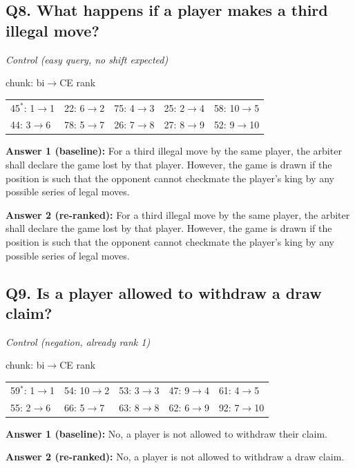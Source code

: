 \subsection*{Q8. What happens if a player makes a third illegal move?}
\emph{Control (easy query, no shift expected)}\par
{\small chunk: bi$\to$CE rank\par\smallskip \begin{tabular}{@{}lllll@{}}
45$^*$: 1$\to$1 & 22: 6$\to$2 & 75: 4$\to$3 & 25: 2$\to$4 & 58: 10$\to$5 \\
44: 3$\to$6 & 78: 5$\to$7 & 26: 7$\to$8 & 27: 8$\to$9 & 52: 9$\to$10
\end{tabular}}\par\smallskip
\textbf{Answer 1 (baseline):} For a third illegal move by the same player, the arbiter shall declare the game lost by that player. However, the game is drawn if the position is such that the opponent cannot checkmate the player’s king by any possible series of legal moves.\par
\textbf{Answer 2 (re-ranked):} For a third illegal move by the same player, the arbiter shall declare the game lost by that player. However, the game is drawn if the position is such that the opponent cannot checkmate the player’s king by any possible series of legal moves.\par

\subsection*{Q9. Is a player allowed to withdraw a draw claim?}
\emph{Control (negation, already rank 1)}\par
{\small chunk: bi$\to$CE rank\par\smallskip \begin{tabular}{@{}lllll@{}}
59$^*$: 1$\to$1 & 54: 10$\to$2 & 53: 3$\to$3 & 47: 9$\to$4 & 61: 4$\to$5 \\
55: 2$\to$6 & 66: 5$\to$7 & 63: 8$\to$8 & 62: 6$\to$9 & 92: 7$\to$10
\end{tabular}}\par\smallskip
\textbf{Answer 1 (baseline):} No, a player is not allowed to withdraw their claim.\par
\textbf{Answer 2 (re-ranked):} No, a player is not allowed to withdraw a draw claim.\par

